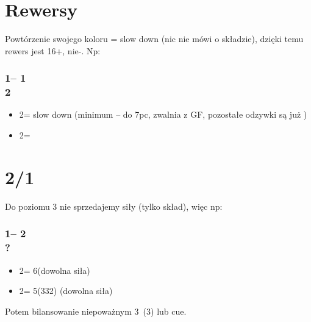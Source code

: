 \documentclass[12pt, a4paper]{report}
\begin{document}
\section*{\colorbox{blue!30}{Rewersy}}
 {
    Powtórzenie swojego koloru = slow down (nic nie mówi o składzie),
    dzięki temu rewers jest 16+, nie-\gf. Np:

    \subsubsection*{1\diams -- 1\spades \\ 2\hearts}
    \begin{itemize}
        \item 2\spades = slow down (minimum -- do 7pc, zwalnia z GF, pozostałe odzywki są już \gf)
        \item 2\nt = \gf
    \end{itemize}
}

\section*{\colorbox{blue!30}{2/1}}
 {
    Do poziomu 3 nie sprzedajemy siły (tylko skład), więc np:\\
    
    \subsubsection*{1\hearts -- 2\clubs \\ ?}
    \begin{itemize}
        \item 2\hearts = 6\hearts (dowolna siła)
        \item 2\nt = 5(332) (dowolna siła)
    \end{itemize}

    Potem bilansowanie niepoważnym 3\nt\ (3\spades) lub cue.
}
\end{document}
